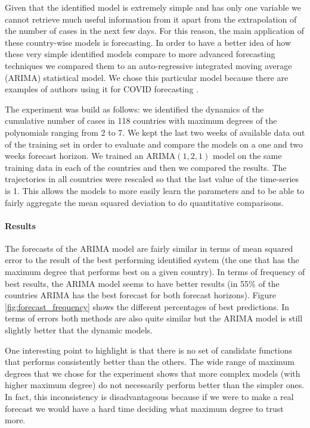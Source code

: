 \documentclass[12pt, letterpaper]{article}
\begin{document}
Given that the identified model is extremely simple and has only one variable we cannot retrieve much useful information from it apart from the extrapolation of the number of cases in the next few days. 
For this reason, the main application of these country-wise models is forecasting. 
In order to have a better idea of how these very simple identified models compare to more advanced forecasting techniques we compared them to an auto-regressive integrated moving average (ARIMA) statistical model. We chose this particular model because there are examples of authors using it for COVID forecasting \cite{arima, arima2}.

The experiment was build as follows: we identified the dynamics of the cumulative number of cases in 118 countries with maximum degrees of the polynomials ranging from 2 to 7. 
We kept the last two weeks of available data out of the training set in order to evaluate and compare the models on a one and two weeks forecast horizon.
We trained an ARIMA$(1, 2, 1)$ model on the same training data in each of the countries and then we compared the results. 
The trajectories in all countries were rescaled so that the last value of the time-series is 1. 
This allows the models to more easily learn the parameters and to be able to fairly aggregate the mean squared deviation to do quantitative comparisons.

\paragraph{Results} The forecasts of the ARIMA model are fairly similar in terms of mean squared error to the result of the best performing identified system (the one that has the maximum degree that performs best on a given country). 
In terms of frequency of best results, the ARIMA model seems to have better results (in 55\% of the countries ARIMA has the best forecast for both forecast horizons). 
Figure \ref{fig:forecast_frequency} shows the different percentages of best predictions.
In terms of errors both methods are also quite similar but the ARIMA model is still slightly better that the dynamic models. 

One interesting point to highlight is that there is no set of candidate functions that performs consistently better than the others. 
The wide range of maximum degrees that we chose for the experiment shows that more complex models (with higher maximum degree) do not necessarily perform better than the simpler ones.
In fact, this inconsistency is disadvantageous because if we were to make a real forecast we would have a hard time deciding what maximum degree to trust more. 
\end{document}
